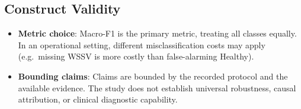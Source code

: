 \subsection{Construct Validity}
\label{sec:construct-validity}

\begin{itemize}
    \item \textbf{Metric choice}: Macro-F1 is the primary metric, treating all classes equally. In an operational setting, different misclassification costs may apply (e.g.~missing WSSV is more costly than false-alarming Healthy).
    \item \textbf{Bounding claims}: Claims are bounded by the recorded protocol and the available evidence. The study does not establish universal robustness, causal attribution, or clinical diagnostic capability.
\end{itemize}